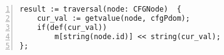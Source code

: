 \begin{figure}
\begin{lstlisting}[numbers=left, tabsize=4, escapechar=@, caption={Code to query post dominator set of a node.},label={lst:result-query}] 
result := traversal(node: CFGNode)  {
	cur_val := getvalue(node, cfgPdom);
	if(def(cur_val))
		m[string(node.id)] << string(cur_val);    
};
\end{lstlisting}
\end{figure}